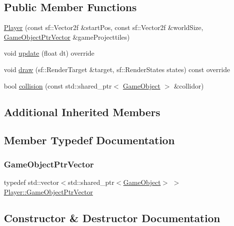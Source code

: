 \subsection*{Public Member Functions}
\begin{DoxyCompactItemize}
\item 
\hyperlink{class_player_a64fb9eae1f16453837b951b04078d8af}{Player} (const sf\+::\+Vector2f \&start\+Pos, const sf\+::\+Vector2f \&world\+Size, \hyperlink{class_player_a2678e391270a5e0fd6c77127657cb4d7}{Game\+Object\+Ptr\+Vector} \&game\+Projecttiles)
\item 
void \hyperlink{class_player_abe2902b7decc38472183a08977eeb57f}{update} (float dt) override
\item 
void \hyperlink{class_player_a0ca934f76860c378cd991a8a32f27edd}{draw} (sf\+::\+Render\+Target \&target, sf\+::\+Render\+States states) const override
\item 
bool \hyperlink{class_player_a669d12e0034e51489a37268b2ca7aab0}{collision} (const std\+::shared\+\_\+ptr$<$ \hyperlink{class_game_object}{Game\+Object} $>$ \&collidor)
\end{DoxyCompactItemize}
\subsection*{Additional Inherited Members}


\subsection{Member Typedef Documentation}
\mbox{\label{class_player_a2678e391270a5e0fd6c77127657cb4d7}} 
\subsubsection{\texorpdfstring{Game\+Object\+Ptr\+Vector}{GameObjectPtrVector}}
{\footnotesize\ttfamily typedef std\+::vector$<$std\+::shared\+\_\+ptr$<$\hyperlink{class_game_object}{Game\+Object}$>$ $>$ \hyperlink{class_player_a2678e391270a5e0fd6c77127657cb4d7}{Player\+::\+Game\+Object\+Ptr\+Vector}}



\subsection{Constructor \& Destructor Documentation}
\mbox{\label{class_player_a64fb9eae1f16453837b951b04078d8af}} 
